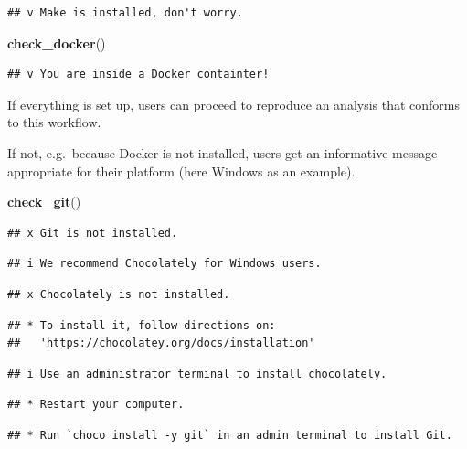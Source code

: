 \documentclass[12pt,a4paper,]{article}
\newenvironment{Shaded}{\begin{snugshade}}{\end{snugshade}}
\newcommand{\KeywordTok}[1]{\textcolor[rgb]{0.13,0.29,0.53}{\textbf{#1}}}
\newcommand{\NormalTok}[1]{#1}
\begin{document}
\begin{verbatim}
## v Make is installed, don't worry.
\end{verbatim}

\begin{Shaded}
\begin{Highlighting}[]
\KeywordTok{check_docker}\NormalTok{()}
\end{Highlighting}
\end{Shaded}

\begin{verbatim}
## v You are inside a Docker containter!
\end{verbatim}

If everything is set up, users can proceed to reproduce an analysis that conforms to this workflow.

If not, e.g.~because Docker is not installed, users get an informative message appropriate for their platform (here Windows as an example).

\begin{Shaded}
\begin{Highlighting}[]
\KeywordTok{check_git}\NormalTok{()}
\end{Highlighting}
\end{Shaded}

\begin{verbatim}
## x Git is not installed.
\end{verbatim}

\begin{verbatim}
## i We recommend Chocolately for Windows users.
\end{verbatim}

\begin{verbatim}
## x Chocolately is not installed.
\end{verbatim}

\begin{verbatim}
## * To install it, follow directions on: 
##   'https://chocolatey.org/docs/installation'
\end{verbatim}

\begin{verbatim}
## i Use an administrator terminal to install chocolately.
\end{verbatim}

\begin{verbatim}
## * Restart your computer.
\end{verbatim}

\begin{verbatim}
## * Run `choco install -y git` in an admin terminal to install Git.
\end{verbatim}
\end{document}

